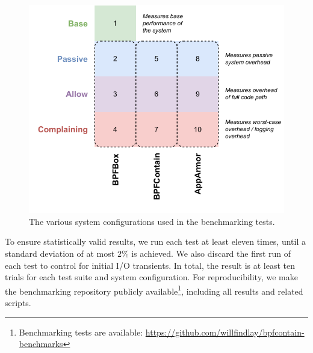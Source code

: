 \begin{figure}[htp]
  \centering
  \includegraphics[width=0.6\linewidth]{figs/eval/configuration.pdf}
  \caption[Benchmarking system configurations]{
    The various system configurations used in the benchmarking tests.
  }%
  \label{fig:configuration}
\end{figure}

To ensure statistically valid results, we run each test at least eleven times, until
a standard deviation of at most $2\%$ is achieved. We also discard the first run of each
test to control for initial I/O transients. In total, the result is at least ten trials
for each test suite and system configuration. For reproducibility, we make the
benchmarking repository publicly available\footnote{Benchmarking tests are available:
\url{https://github.com/willfindlay/bpfcontain-benchmarks}}, including all results and
related scripts.



